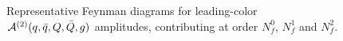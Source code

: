 \begin{figure}[ht]
  \begin{center}
\end{center} 
\caption{Representative Feynman diagrams for leading-color
$\mathcal{A}^{(2)}(q,\bar q,Q,\bar Q,g)$ amplitudes, 
contributing at order
$N_f^0$, $N_f^1$ and $N_f^2$.}
\label{fig_parents4q1g}
\end{figure}


